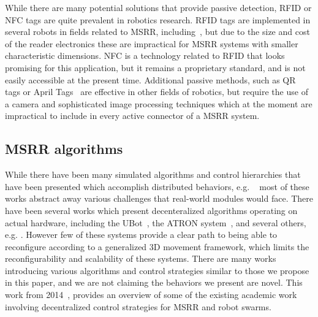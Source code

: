 While there are many potential solutions that provide passive detection, RFID or NFC tags are quite prevalent in robotics research. RFID tags are implemented in several robots in fields related to MSRR, including~\cite{werfel2006distributed}, but due to the size and cost of the reader electronics these are impractical for MSRR systems with smaller characteristic dimensions. NFC is a technology related to RFID that looks promising for this application, but it remains a proprietary standard, and is not easily accessible at the present time. Additional passive methods, such as QR tags or April Tags~\cite{wang2016iros} are effective in other fields of robotics, but require the use of a camera and sophisticated image processing techniques which at the moment are impractical to include in every active connector of a MSRR system.

\subsection{MSRR algorithms}
\label{ssec:RW-Algorithmic}
While there have been many simulated algorithms and control hierarchies that have been presented which accomplish distributed behaviors, e.g. ~\cite{Jones-ICRA03, butler2002generic, stoy-747simulation-2004} most of these works abstract away various challenges that real-world modules would face. There have been several works which present decenteralized algorithms operating on actual hardware, including the UBot~\cite{zhu2015simplified}, the ATRON system~\cite{christensen2013distributed}, and several others, e.g. \cite{germanswarm-Levi-2014, Yim-IROS07}. However few of these systems provide a clear path to being able to reconfigure according to a generalized 3D movement framework, which limits the reconfigurability and scalability of these systems. There are many works introducing various algorithms and control strategies similar to those we propose in this paper, and we are not claiming the behaviors we present are novel. This work from 2014~\cite{abukhalil2013survey}, provides an overview of some of the existing academic work involving decentralized control strategies for MSRR and robot swarms.

